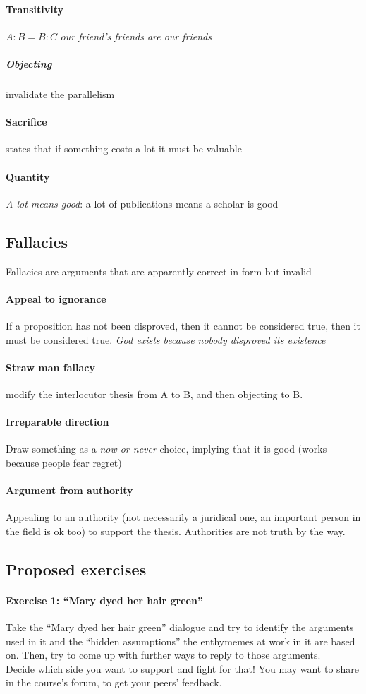 \documentclass{article}
\begin{document}
\paragraph{Transitivity} $A:B=B:C$ \textit{our friend's friends are our friends}
\subparagraph{Objecting} invalidate the parallelism
\paragraph{Sacrifice} states that if something costs a lot it must be valuable
\paragraph{Quantity} \textit{A lot means good}: a lot of publications means a scholar is good

\subsection{Fallacies}
Fallacies are arguments that are apparently correct in form but invalid
\paragraph{Appeal to ignorance} If a proposition has not been disproved, then it cannot be considered true, then it must be considered true. \textit{God exists because nobody disproved its existence}
\paragraph{Straw man fallacy} modify the interlocutor thesis from A to B, and then objecting to B.
\paragraph{Irreparable direction} Draw something as a \textit{now or never} choice, implying that it is good (works because people fear regret)
\paragraph{Argument from authority} Appealing to an authority (not necessarily a juridical one, an important person in the field is ok too) to support the thesis. Authorities are not truth by the way.
\subsection{Proposed exercises} 
\paragraph{Exercise 1: “Mary dyed her hair green”}
Take the “Mary dyed her hair green” dialogue and try to identify the arguments used in it and the “hidden assumptions” the enthymemes at work in it are based on. Then, try to come up with further ways to reply to those arguments.\\
Decide which side you want to support and fight for that! You may want to share in the course’s forum, to get your peers’ feedback.
\end{document}
